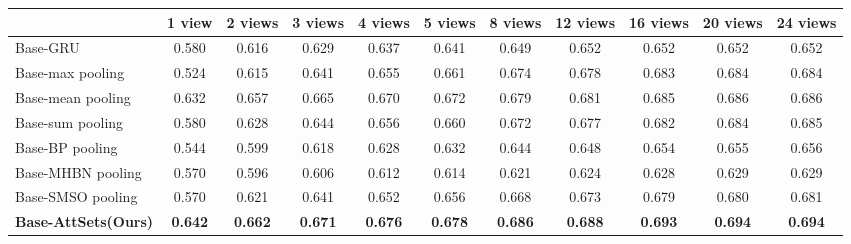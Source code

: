 \documentclass[twocolumn]{svjour3}    \pdfoutput=1
\newcommand{\nickname}{AttSets}
\begin{document}
\begin{table*}[t]
\caption{Group 2: mean IoU for multi-view reconstruction of all 13 categories in ShapeNet testing split. All networks are firstly trained given only 1 image for each object in Stage 1. The \nickname{} module is further trained given \textbf{8 images} per object in Stage 2, while other competing approaches are fine-tuned given \textbf{8 images} per object in Stage 2.}
\centering
\label{tab:iou_r2n2_08v}
\tabcolsep=0.125cm
\begin{tabular}{ l|cccccccccc}
\hline
&1 view&2 views&3 views& 4 views&5 views&8 views&12 views&16 views&20 views&24 views \\
\hline
Base-GRU &0.580&0.616&0.629&0.637&0.641&0.649&0.652&0.652&0.652&0.652 \\
Base-max pooling &0.524&0.615&0.641&0.655&0.661&0.674&0.678&0.683&0.684&0.684 \\
Base-mean pooling &0.632&0.657&0.665&0.670&0.672&0.679&0.681&0.685&0.686&0.686 \\
Base-sum pooling &0.580&0.628&0.644&0.656&0.660&0.672&0.677&0.682&0.684&0.685 \\
Base-BP pooling &0.544&0.599&0.618&0.628&0.632&0.644&0.648&0.654&0.655&0.656 \\
Base-MHBN pooling &0.570&0.596&0.606&0.612&0.614&0.621&0.624&0.628&0.629&0.629 \\
Base-SMSO pooling &0.570&0.621&0.641&0.652&0.656&0.668&0.673&0.679&0.680&0.681 \\
\textbf{Base-\nickname{}(Ours)} &\textbf{0.642}&\textbf{0.662}&\textbf{0.671}&\textbf{0.676}&\textbf{0.678}&\textbf{0.686}
&\textbf{0.688}&\textbf{0.693}&\textbf{0.694}&\textbf{0.694} \\
\hline
\end{tabular}
\vspace{-0.1 cm}
\end{table*}
\end{document}
